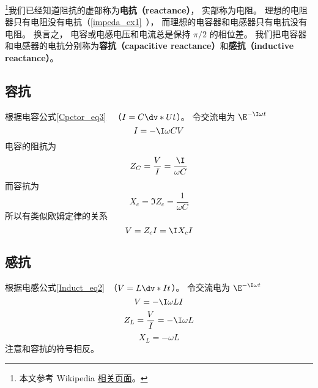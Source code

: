 

\footnote{本文参考 Wikipedia \href{https://en.wikipedia.org/wiki/Electrical_reactance}{相关页面}。}我们已经知道阻抗的虚部称为\textbf{电抗（reactance）}， 实部称为电阻。 理想的电阻器只有电阻没有电抗（\autoref{impeda_ex1}~）， 而理想的电容器和电感器只有电抗没有电阻。 换言之， 电容或电感电压和电流总是保持 $\pi/2$ 的相位差。 我们把电容器和电感器的电抗分别称为\textbf{容抗（capacitive reactance）}和\textbf{感抗（inductive reactance）}。

\subsection{容抗}
根据电容公式\autoref{Cpctor_eq3}~ （$I = C\dv*{U}{t}$）。 令交流电为 $\E^{-\I \omega t}$
\begin{equation}
I = -\I \omega CV
\end{equation}
电容的阻抗为
\begin{equation}
Z_C = \frac{V}{I} = \frac{\I}{\omega C}
\end{equation}
而容抗为
\begin{equation}
X_c = \Im{Z_c} = \frac{1}{\omega C}
\end{equation}
所以有类似欧姆定律的关系
\begin{equation}
V = Z_c I = \I X_c I
\end{equation}

\subsection{感抗}
根据电感公式\autoref{Induct_eq2}~（$V = L\dv*{I}{t}$）。 令交流电为 $\E^{-\I \omega t}$
\begin{equation}
V = -\I\omega L I
\end{equation}
\begin{equation}
Z_L = \frac{V}{I} = -\I\omega L
\end{equation}
\begin{equation}
X_L = -\omega L
\end{equation}
注意和容抗的符号相反。
